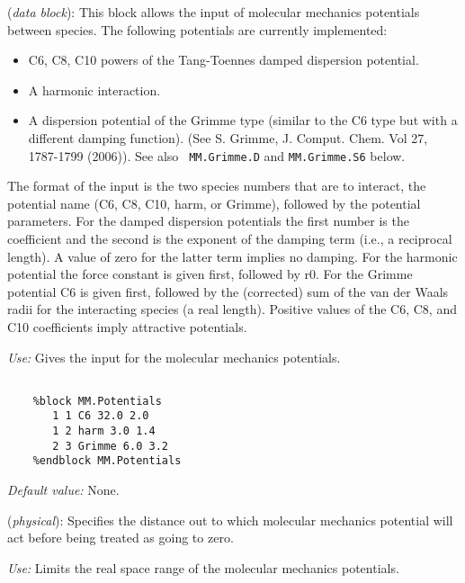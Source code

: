 \documentclass[11pt]{article}
\begin{document}
\begin{description}
\itemsep 10pt
\parsep 0pt

\item[{\bf MM.Potentials}] ({\it data block}):
 This block allows the input
of molecular mechanics potentials between species. The following
potentials are currently implemented:
\begin{itemize}
\item C6, C8, C10 powers of the Tang-Toennes damped dispersion
  potential.
\item A harmonic interaction.
\item A dispersion potential of the Grimme type (similar to the C6
  type but with a different damping function). (See S. Grimme,
  J. Comput. Chem. Vol 27, 1787-1799 (2006)). See also {\tt
  MM.Grimme.D} and {\tt MM.Grimme.S6} below.
\end{itemize}

The format of the input is the two species
numbers that are to interact, the potential name (C6, C8, C10, harm,
or Grimme), followed by the potential parameters. For the damped dispersion
potentials the first number is the coefficient and the second is the
exponent of the damping term (i.e., a reciprocal length). A value of
zero for the latter term implies no damping. For the harmonic
potential the force constant is given first, followed by r0. For the
Grimme potential C6 is given first, followed by the (corrected) sum of
the van der Waals radii for the interacting species (a real length). Positive
values of the C6, C8, and C10 coefficients imply attractive potentials.

{\it Use:} Gives the input for the molecular mechanics potentials.

\begin{verbatim}

    %block MM.Potentials
       1 1 C6 32.0 2.0
       1 2 harm 3.0 1.4
       2 3 Grimme 6.0 3.2
    %endblock MM.Potentials

\end{verbatim}

{\it Default value:}  None.

\item[{\bf MM.Cutoff}] ({\it physical}):  Specifies the distance out to which molecular mechanics
potential will act before being treated as going to zero.

{\it Use:} Limits the real space range of the molecular mechanics
potentials.


\end{description}
\end{document}
